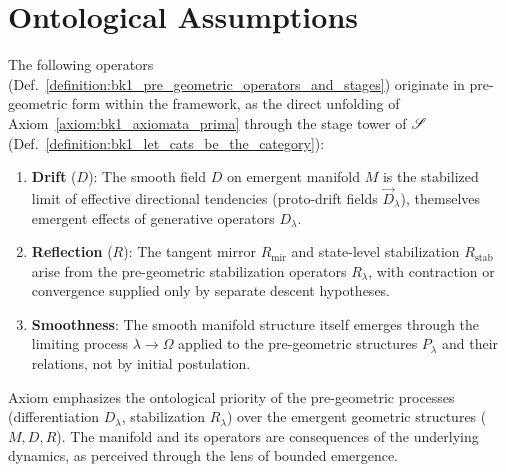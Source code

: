 \section{Ontological Assumptions}
\label{sec:bk1_ontological_assumptions}
\begin{axiom}
\label{axiom:bk1_pre_geometric_nature}
\leavevmode\newline
The following operators
(Def.~\ref{definition:bk1_pre_geometric_operators_and_stages}) originate in
pre-geometric form within the framework, as the direct unfolding of
Axiom~\ref{axiom:bk1_axiomata_prima} through the stage tower of $\mathscr{S}$
(Def.~\ref{definition:bk1_let_cats_be_the_category}):
\begin{enumerate}
    \item \textbf{Drift} ($D$): The smooth field $D$ on emergent manifold $M$
    is the stabilized limit of effective directional tendencies
    (proto-drift fields $\vec{D}_\lambda$), themselves emergent effects of
    generative operators $D_\lambda$.
    \item \textbf{Reflection} ($R$): The tangent mirror \(R_{\mathrm{mir}}\) and state-level stabilization \(R_{\mathrm{stab}}\) arise from the pre-geometric stabilization operators \(R_\lambda\), with contraction or convergence supplied only by separate descent hypotheses.
    \item \textbf{Smoothness}: The smooth manifold structure itself emerges through the limiting process $\lambda \to \Omega$ applied to the pre-geometric structures $P_\lambda$ and their relations, not by initial postulation.
\end{enumerate}
\end{axiom}
\begin{remark}
Axiom  emphasizes the ontological priority of the pre-geometric processes (differentiation $D_\lambda$, stabilization $R_\lambda$) over the emergent geometric structures ($M, D, R$). The manifold and its operators are consequences of the underlying dynamics, as perceived through the lens of bounded emergence.
\end{remark}
